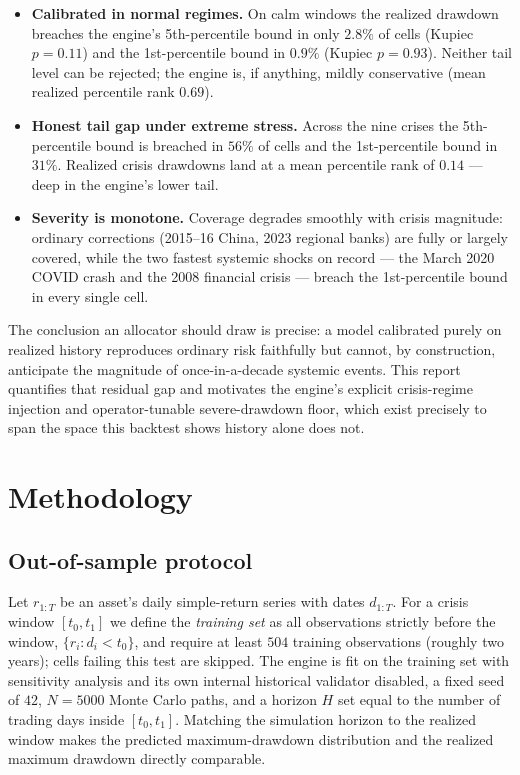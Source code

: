 \documentclass[11pt]{article}
\begin{document}
\begin{itemize}[leftmargin=1.4em, itemsep=2pt]
  \item \textbf{Calibrated in normal regimes.} On calm windows the realized
  drawdown breaches the engine's 5th-percentile bound in only $2.8\%$ of cells
  (Kupiec $p = 0.11$) and the 1st-percentile bound in $0.9\%$ (Kupiec
  $p = 0.93$). Neither tail level can be rejected; the engine is, if anything,
  mildly conservative (mean realized percentile rank $0.69$).

  \item \textbf{Honest tail gap under extreme stress.} Across the nine crises
  the 5th-percentile bound is breached in $56\%$ of cells and the
  1st-percentile bound in $31\%$. Realized crisis drawdowns land at a mean
  percentile rank of $0.14$ --- deep in the engine's lower tail.

  \item \textbf{Severity is monotone.} Coverage degrades smoothly with crisis
  magnitude: ordinary corrections (2015--16 China, 2023 regional banks) are
  fully or largely covered, while the two fastest systemic shocks on record
  --- the March 2020 COVID crash and the 2008 financial crisis --- breach the
  1st-percentile bound in every single cell.
\end{itemize}

The conclusion an allocator should draw is precise: a model calibrated purely
on realized history reproduces ordinary risk faithfully but cannot, by
construction, anticipate the magnitude of once-in-a-decade systemic events.
This report quantifies that residual gap and motivates the engine's explicit
crisis-regime injection and operator-tunable severe-drawdown floor, which exist
precisely to span the space this backtest shows history alone does not.

\tableofcontents
\newpage

\section{Methodology}

\subsection{Out-of-sample protocol}
Let $r_{1:T}$ be an asset's daily simple-return series with dates $d_{1:T}$.
For a crisis window $[t_0, t_1]$ we define the \emph{training set} as all
observations strictly before the window, $\{r_i : d_i < t_0\}$, and require at
least $504$ training observations (roughly two years); cells failing this test
are skipped. The engine is fit on the training set with sensitivity analysis
and its own internal historical validator disabled, a fixed seed of $42$,
$N = 5000$ Monte Carlo paths, and a horizon $H$ set equal to the number of
trading days inside $[t_0, t_1]$. Matching the simulation horizon to the
realized window makes the predicted maximum-drawdown distribution and the
realized maximum drawdown directly comparable.
\end{document}
